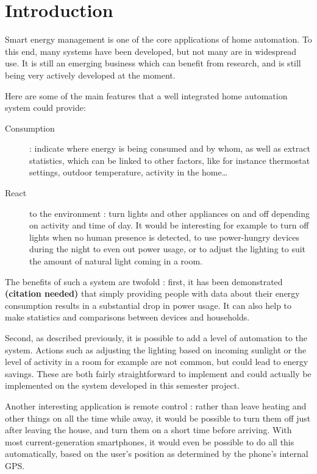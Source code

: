 \section*{Introduction}
Smart energy management is one of the core applications of home automation. To
this end, many systems have been developed, but not many are in widespread use.
It is still an emerging business which can benefit from research, and is still
being very actively developed at the moment.

Here are some of the main features that a well integrated home automation system
could provide:
\begin{description}
  \item[Consumption] : indicate where energy is being consumed and by whom, as
    well as extract statistics, which can be linked to other factors, like for
    instance thermostat settings, outdoor temperature, activity in the
    home\ldots
  \item[React] to the environment : turn lights and other appliances on and off
    depending on activity and time of day. It would be interesting for example
    to turn off lights when no human presence is detected, to use power-hungry
    devices during the night to even out power usage, or to adjust the lighting
    to suit the amount of natural light coming in a room. 
\end{description}


The benefits of such a system are twofold : first, it has been demonstrated
\textbf{(citation needed)} that simply providing people with data about their
energy consumption results in a substantial drop in power usage. It can also
help to make statistics and comparisons between devices and households.

Second, as described previously, it is possible to add a level of automation to
the system. Actions such as adjusting the lighting based on incoming sunlight or
the level of activity in a room for example are not common, but could lead to
energy savings. These are both fairly straightforward to implement and could
actually be implemented on the system developed in this semester project.

Another interesting application is remote control : rather than leave heating
and other things on all the time while away, it would be possible to turn them
off just after leaving the house, and turn them on a short time before arriving.
With most current-generation smartphones, it would even be possible to do all
this automatically, based on the user's position as determined by the phone's
internal GPS.


